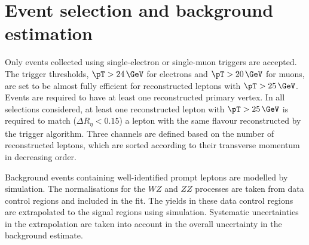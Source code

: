 \section{Event selection and background estimation}
\label{s:selection}

Only events collected using single-electron or single-muon triggers are
accepted. The trigger thresholds,  $\pT > 24\,\GeV$ for electrons and
 $\pT > 20\,\GeV$ for muons, are set to be almost fully efficient for
reconstructed leptons with $\pT > 25\,\GeV$.  Events are required
to have at least one reconstructed primary vertex.  In all selections
considered, at least one reconstructed lepton with $\pT > 25\,\GeV$ is required
to match ($\Delta R_{\eta} < 0.15$) a lepton with the same flavour
reconstructed by the trigger algorithm.  Three channels are defined based on
the number of reconstructed leptons, which are sorted according to their
transverse momentum in decreasing order. 

Background events containing well-identified prompt leptons are modelled by simulation. The
normalisations for the $WZ$ and $ZZ$ processes are taken from data control regions and 
included in the fit.
The yields in these data control regions are 
extrapolated to the signal regions using simulation.
Systematic uncertainties in the extrapolation are taken into account in the
overall uncertainty in the background estimate.

